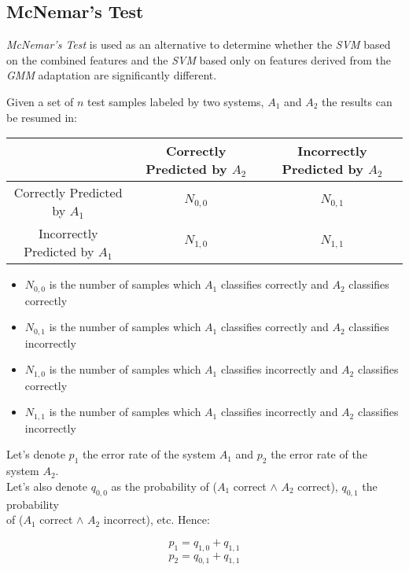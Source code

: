\subsection{McNemar's Test}

\textit{McNemar's Test} is used as an alternative to determine whether the \textit{SVM}
based on the combined features and the \textit{SVM} based only on features
derived from the \textit{GMM} adaptation are significantly different.

\cite{mcnemar} Given a set of $n$ test samples labeled by two systems, $A_{1}$ and $A_{2}$
the results can be resumed in:

\begin{center}
    \begin{tabular}{ | c | c | c | }
    \hline
    & Correctly Predicted by $A_{2}$ & Incorrectly Predicted by $A_{2}$ \\ \hline
    Correctly Predicted by $A_{1}$ & $N_{0,0}$ & $N_{0,1}$ \\ \hline
    Incorrectly Predicted by $A_{1}$ & $N_{1,0}$ & $N_{1,1}$ \\ \hline
    \end{tabular}
\end{center}

\begin{itemize}
\item{$N_{0, 0}$ is the number of samples which $A_{1}$ classifies correctly and $A_{2}$ classifies correctly}
\item{$N_{0, 1}$ is the number of samples which $A_{1}$ classifies correctly and $A_{2}$ classifies incorrectly}
\item{$N_{1, 0}$ is the number of samples which $A_{1}$ classifies incorrectly and $A_{2}$ classifies correctly}
\item{$N_{1, 1}$ is the number of samples which $A_{1}$ classifies incorrectly and $A_{2}$ classifies incorrectly}
\end{itemize}

Let's denote $p_{1}$ the error rate of the system $A_{1}$ and $p_{2}$ the error rate of the
system $A_{2}$. \\
Let's also denote $q_{0,0}$ as the probability of ($A_{1}$ correct $\land$ $A_{2}$ correct),
$q_{0,1}$ the probability \\ of ($A_{1}$ correct $\land$ $A_{2}$ incorrect), etc. Hence:

\begin{multicols}{2}
  \noindent
  \begin{equation}
    p_{1} = q_{1,0} + q_{1,1}
  \end{equation}
  \begin{equation}
    p_{2} = q_{0,1} + q_{1,1}
  \end{equation}
\end{multicols}

